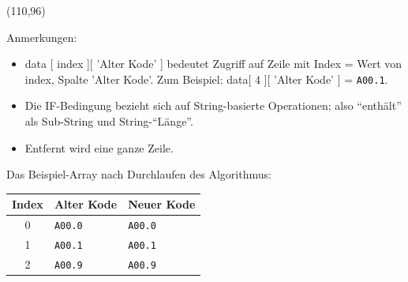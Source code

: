 \begin{struktogramm}(110,96)
    \change
    \ifend
    \whileend
\end{struktogramm}

Anmerkungen:

\begin{itemize}
\item  data [ index ][ 'Alter Kode' ] bedeutet Zugriff auf Zeile mit Index = Wert von index, Spalte 'Alter Kode'. Zum Beispiel: data[ 4 ][ 'Alter Kode' ] = \texttt{A00.1}.
\item Die IF-Bedingung bezieht sich auf String-basierte Operationen; also ``enthält'' als Sub-String und String-``Länge''.
\item Entfernt wird eine ganze Zeile. 
\end{itemize}

\newpage

Das Beispiel-Array nach Durchlaufen des Algorithmus: 

\begingroup
\renewcommand{\arraystretch}{1.2}
\setlength{\tabcolsep}{12pt}
\begin{tabular}{cll}
Index & Alter Kode & Neuer Kode \\
\hline
0 & \texttt{A00.0} & \texttt{A00.0} \\
1 & \texttt{A00.1} & \texttt{A00.1} \\
2 & \texttt{A00.9} & \texttt{A00.9} \\
\end{tabular}
\endgroup

